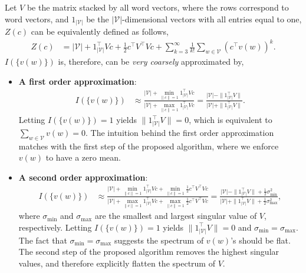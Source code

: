 \documentclass{article} \usepackage{acl2017,times}
\begin{document}
{Let $V$ be the matrix stacked by all word vectors, where the rows correspond to word vectors, and $1_{|\mathcal{V}|}$ be the  $|\mathcal{V}|$-dimensional vectors with all entries equal to one, $Z(c)$ can be equivalently defined as follows,
\begin{align*}
    Z(c) 
&= |\mathcal{\mathcal{V}}| + 1_|\mathcal{V}|^{\top} V c + \frac{1}{2} c^{\top} V^{\top} Vc + \sum_{k=3}^{\infty} \frac{1}{k!} \sum_{w\in \mathcal{V}} (c^{\top} v(w))^k.
\end{align*}
$I(\{v(w)\})$ is, therefore, can be {\em very coarsely} approximated by,
\begin{itemize}
\item {\bf A first order approximation}:
\begin{align*}
    I(\{v(w)\}) &\approx \frac{|\mathcal{V}| + \min_{\|c\|=1}1_{|\mathcal{V}|}^{\top} Vc}{|\mathcal{V}| + \max_{\|c\|=1}1_{|\mathcal{V}|}^{\top} Vc} =  \frac{|\mathcal{V}| -  \|1_{|\mathcal{V}|}^{\top}V\|}{|\mathcal{V}| + \|1_{|\mathcal{V}|}^{\top}V\|}.
\end{align*}
Letting $I(\{v(w)\})=1$ yields $ \|1_{|\mathcal{V}|}^{\top}V\| = 0$, which is equivalent to $\sum_{w\in\mathcal{V}} v(w) = 0$. The intuition behind the first order approximation matches with the first step of the proposed algorithm, where we enforce $v(w)$ to have a  zero mean.
\item {\bf A second order approximation}:
\begin{align*}
    I(\{v(w)\}) 
    &\approx \frac{|\mathcal{V}| + \min_{\|c\|=1}1_{|\mathcal{V}|}^{\top} Vc + \min_{\|c\|=1}\frac{1}{2}c^{\top} V^{\top} Vc}{|\mathcal{V}| + \max_{\|c\|=1}1_{|\mathcal{V}|}^{\top} Vc + \max_{\|c\|=1}\frac{1}{2}c^{\top} V^{\top} Vc} =  \frac{|\mathcal{V}| - \|1_{|\mathcal{V}|}^{\top}V\| + \frac{1}{2}\sigma_{\min}^2}{ |\mathcal{V}| + \|1_{|\mathcal{V}|}^{\top}V\| + \frac{1}{2}\sigma_{\max}^2},
\end{align*}
where $\sigma_{\min}$ and $\sigma_{\max}$ are the smallest and largest singular value of $V$, respectively. Letting $I(\{v(w)\}) = 1$ yields $ \|1_{|\mathcal{V}|}^{\top}V\| = 0$ and $\sigma_{\min} = \sigma_{\max}$. The fact that $\sigma_{\min} = \sigma_{\max}$ suggests the spectrum of $v(w)$'s should be flat. The second step of the proposed algorithm removes the highest singular values, and therefore explicitly flatten the spectrum of $V$. 
\end{itemize}


}
\end{document}
